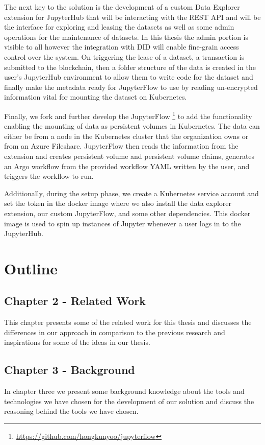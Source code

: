 \bigskip
The next key to the solution is the development of a custom Data Explorer extension for JupyterHub that will be interacting with the REST API and will be the interface for exploring and leasing the datasets as well as some admin operations for the maintenance of datasets. In this thesis the admin portion is visible to all however the integration with DID will enable fine-grain access control over the system. On triggering the lease of a dataset, a transaction is submitted to the blockchain, then a folder structure of the data is created in the user's JupyterHub environment to allow them to write code for the dataset and finally make the metadata ready for JupyterFlow to use by reading un-encrypted information vital for mounting the dataset on Kubernetes.

\bigskip
Finally, we fork and further develop the JupyterFlow \footnote{\url{https://github.com/hongkunyoo/jupyterflow}} to add the functionality enabling the mounting of data as persistent volumes in Kubernetes. The data can either be from a node in the Kubernetes cluster that the organization owns or from an Azure Fileshare. JupyterFlow then reads the information from the extension and creates persistent volume and persistent volume claims, generates an Argo workflow from the provided workflow YAML written by the user, and triggers the workflow to run.

\bigskip
Additionally, during the setup phase, we create a Kubernetes service account and set the token in the docker image where we also install the data explorer extension, our custom JupyterFlow, and some other dependencies. This docker image is used to spin up instances of Jupyter whenever a user logs in to the JupyterHub.

\section{Outline}

\subsection{Chapter 2 - Related Work}
This chapter presents some of the related work for this thesis and discusses the differences in our approach in comparison to the previous research and inspirations for some of the ideas in our thesis.

\subsection{Chapter 3 - Background}
In chapter three we present some background knowledge about the tools and technologies we have chosen for the development of our solution and discuss the reasoning behind the tools we have chosen.


